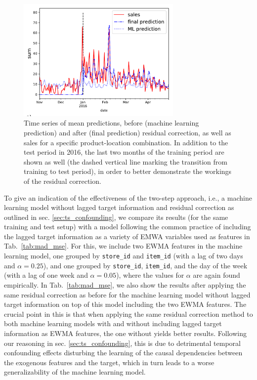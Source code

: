 \documentclass[BCOR=1mm, DIV=calc,10pt,
twoside=true,
twocolumn,
headings=normal]{scrartcl}
\newcommand{\tab}{Tab.~}
\begin{document}
\begin{figure}
\begin{center}
\includegraphics[width=8cm]{figs/ts_item_16_store_2_res}
\caption{\label{fig:ts_res} Time series of mean predictions, before (machine learning prediction) and after (final prediction) residual correction, as well as sales for a specific product-location combination. In addition to the test period in 2016, the last two months of the training period are shown as well (the dashed vertical line marking the transition from training to test period), in order to better demonstrate the workings of the residual correction.}
\end{center}
\end{figure}

\noindent
To give an indication of the effectiveness of the two-step approach, i.e., a machine learning model without lagged target information and residual correction as outlined in sec. \ref{sec:ts_confounding}, we compare its results (for the same training and test setup) with a model following the common practice of including the lagged target information as a variety of EMWA variables used as features in \tab \ref{tab:mad_mse}. For this, we include two EWMA features in the machine learning model, one grouped by \texttt{store\_id} and \texttt{item\_id} (with a lag of two days and $\alpha=0.25$), and one grouped by \texttt{store\_id}, \texttt{item\_id}, and the day of the week (with a lag of one week and $\alpha=0.05$), where the values for $\alpha$ are again found empirically. In \tab \ref{tab:mad_mse}, we also show the results after applying the same residual correction as before for the machine learning model without lagged target information on top of this model including the two EWMA features. The crucial point in this is that when applying the same residual correction method to both machine learning models with and without including lagged target information as EWMA features, the one without yields better results. Following our reasoning in sec. \ref{sec:ts_confounding}, this is due to detrimental temporal confounding effects disturbing the learning of the causal dependencies between the exogenous features and the target, which in turn leads to a worse generalizability of the machine learning model.
\end{document}
